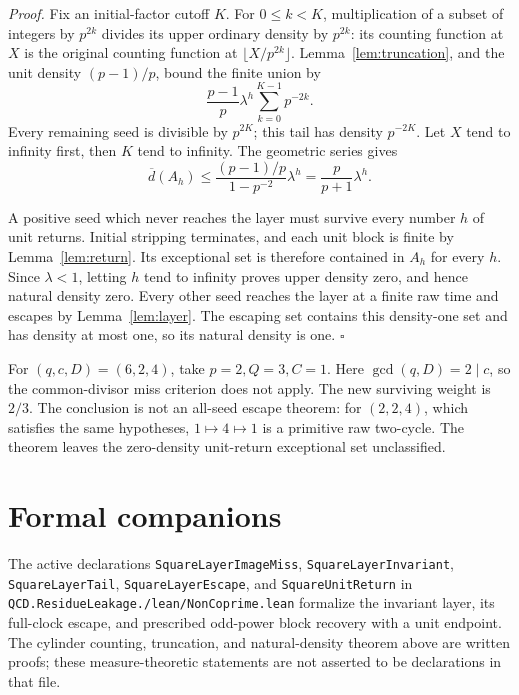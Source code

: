 \documentclass[11pt,letterpaper]{article}
\newenvironment{proof}{\noindent\textit{Proof.}}{\hfill\(\square\)}
\begin{document}
\begin{proof}
Fix an initial-factor cutoff \(K\).
For \(0\le k<K\), multiplication of a subset of integers by \(p^{2k}\) divides its upper ordinary density by \(p^{2k}\):
its counting function at \(X\) is the original counting function at \(\lfloor X/p^{2k}\rfloor\).
Lemma~\ref{lem:truncation}, and the unit density \((p-1)/p\), bound the finite union by
\[
\frac{p-1}{p}\lambda^h\sum_{k=0}^{K-1}p^{-2k}.
\]
Every remaining seed is divisible by \(p^{2K}\); this tail has density \(p^{-2K}\).
Let \(X\) tend to infinity first, then \(K\) tend to infinity. The geometric series gives
\[
\overline d(A_h)\le
\frac{(p-1)/p}{1-p^{-2}}\lambda^h
=\frac{p}{p+1}\lambda^h.
\]

A positive seed which never reaches the layer must survive every number \(h\) of unit returns.
Initial stripping terminates, and each unit block is finite by Lemma~\ref{lem:return}.
Its exceptional set is therefore contained in \(A_h\) for every \(h\).
Since \(\lambda<1\), letting \(h\) tend to infinity proves upper density zero, and hence natural density zero.
Every other seed reaches the layer at a finite raw time and escapes by Lemma~\ref{lem:layer}.
The escaping set contains this density-one set and has density at most one, so its natural density is one.
\end{proof}

For \((q,c,D)=(6,2,4)\), take \(p=2,Q=3,C=1\).
Here \(\gcd(q,D)=2\mid c\), so the common-divisor miss criterion does not apply.
The new surviving weight is \(2/3\).
The conclusion is not an all-seed escape theorem:
for \((2,2,4)\), which satisfies the same hypotheses, \(1\mapsto4\mapsto1\) is a primitive raw two-cycle.
The theorem leaves the zero-density unit-return exceptional set unclassified.

\section{Formal companions}

The active declarations \texttt{Square\allowbreak Layer\allowbreak Image\allowbreak Miss}, \texttt{Square\allowbreak Layer\allowbreak Invariant},
\texttt{Square\allowbreak Layer\allowbreak Tail}, \texttt{Square\allowbreak Layer\allowbreak Escape}, and \texttt{Square\allowbreak Unit\allowbreak Return}
in \texttt{QCD.\allowbreak Residue\allowbreak Leakage./\allowbreak lean/\allowbreak Non\allowbreak Coprime.\allowbreak lean} formalize the invariant layer, its full-clock escape, and prescribed odd-power block recovery with a unit endpoint.
The cylinder counting, truncation, and natural-density theorem above are written proofs; these measure-theoretic statements are not asserted to be declarations in that file.
\end{document}
